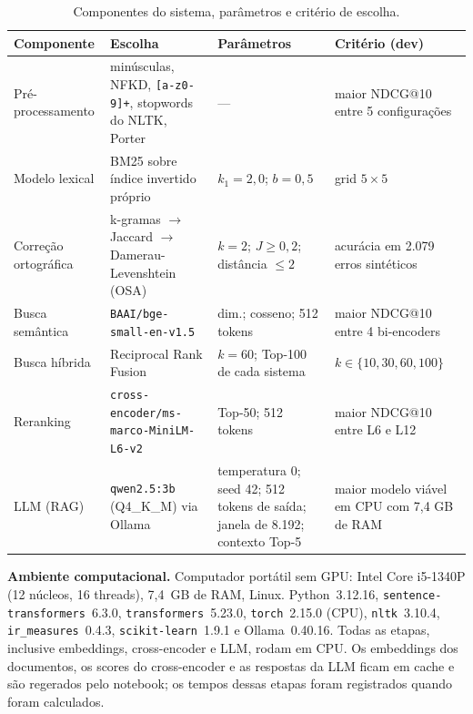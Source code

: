 \documentclass[10pt,a4paper]{article}
\begin{document}
\begin{table}[!htb]
\centering\small
\caption{Componentes do sistema, parâmetros e critério de escolha.}
\label{tab:componentes}
\begin{tabularx}{\linewidth}{@{}l>{\raggedright\arraybackslash}X>{\raggedright\arraybackslash}p{4.3cm}>{\raggedright\arraybackslash}p{3.9cm}@{}}
\toprule
Componente & Escolha & Parâmetros & Critério (dev) \\
\midrule
Pré-processamento & minúsculas, NFKD, \texttt{[a-z0-9]+}, stopwords do NLTK, Porter & --- & maior NDCG@10 entre 5 configurações \\
Modelo lexical & BM25 sobre índice invertido próprio & $k_1 = 2{,}0$; $b = 0{,}5$ & grid $5 \times 5$ \\
Correção ortográfica & k-gramas $\to$ Jaccard $\to$ Damerau-Levenshtein (OSA) & $k = 2$; $J \ge 0{,}2$; distância $\le 2$ & acurácia em 2.079 erros sintéticos \\
Busca semântica & \texttt{BAAI/bge-small-en-v1.5} & 384 dim.; cosseno; 512 tokens & maior NDCG@10 entre 4 bi-encoders \\
Busca híbrida & Reciprocal Rank Fusion & $k = 60$; Top-100 de cada sistema & $k \in \{10, 30, 60, 100\}$ \\
Reranking & \texttt{cross-encoder/\allowbreak ms-marco-MiniLM-L6-v2} & Top-50; 512 tokens & maior NDCG@10 entre L6 e L12 \\
LLM (RAG) & \texttt{qwen2.5:3b} (Q4\_K\_M) via Ollama & temperatura 0; seed 42; 512 tokens de saída; janela de 8.192; contexto Top-5 & maior modelo viável em CPU com 7,4 GB de RAM \\
\bottomrule
\end{tabularx}
\end{table}

\textbf{Ambiente computacional.} Computador portátil sem GPU: Intel Core i5-1340P (12 núcleos, 16 threads), 7,4~GB de RAM, Linux. Python~3.12.16, \texttt{sentence-transformers}~6.3.0, \texttt{transformers}~5.23.0, \texttt{torch}~2.15.0 (CPU), \texttt{nltk}~3.10.4, \texttt{ir\_measures}~0.4.3, \texttt{scikit-learn}~1.9.1 e Ollama~0.40.16. Todas as etapas, inclusive embeddings, cross-encoder e LLM, rodam em CPU. Os embeddings dos documentos, os scores do cross-encoder e as respostas da LLM ficam em cache e são regerados pelo notebook; os tempos dessas etapas foram registrados quando foram calculados.
\end{document}
